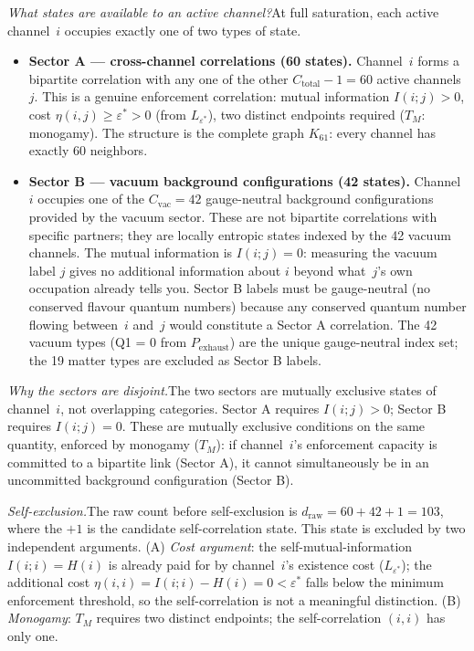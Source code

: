 \documentclass[11pt]{article}
\newenvironment{varlist}{\begin{itemize}[nosep,leftmargin=2em]}{\end{itemize}}
\begin{document}
\textit{What states are available to an active channel?}\quad  At full saturation, each active channel~$i$ occupies exactly one of two types of state.

\begin{varlist}
\item \textbf{Sector A --- cross-channel correlations (60 states).}  Channel~$i$ forms a bipartite correlation with any one of the other $C_{\mathrm{total}} - 1 = 60$ active channels~$j$.  This is a genuine enforcement correlation: mutual information $I(i;j) > 0$, cost $\eta(i,j) \ge \varepsilon^* > 0$ (from $L_{\varepsilon^*}$), two distinct endpoints required ($T_M$: monogamy).  The structure is the complete graph $K_{61}$: every channel has exactly 60 neighbors.
\item \textbf{Sector B --- vacuum background configurations (42 states).}  Channel~$i$ occupies one of the $C_{\mathrm{vac}} = 42$ gauge-neutral background configurations provided by the vacuum sector.  These are not bipartite correlations with specific partners; they are locally entropic states indexed by the 42 vacuum channels.  The mutual information is $I(i;j) = 0$: measuring the vacuum label $j$ gives no additional information about $i$ beyond what~$j$'s own occupation already tells you.  Sector B labels must be gauge-neutral (no conserved flavour quantum numbers) because any conserved quantum number flowing between~$i$ and~$j$ would constitute a Sector A correlation.  The 42 vacuum types (Q1 = 0 from $P_{\mathrm{exhaust}}$) are the unique gauge-neutral index set; the 19 matter types are excluded as Sector B labels.
\end{varlist}

\textit{Why the sectors are disjoint.}\quad The two sectors are mutually exclusive states of channel~$i$, not overlapping categories.  Sector A requires $I(i;j) > 0$; Sector B requires $I(i;j) = 0$.  These are mutually exclusive conditions on the same quantity, enforced by monogamy ($T_M$): if channel~$i$'s enforcement capacity is committed to a bipartite link (Sector A), it cannot simultaneously be in an uncommitted background configuration (Sector B).

\textit{Self-exclusion.}\quad The raw count before self-exclusion is $d_{\mathrm{raw}} = 60 + 42 + 1 = 103$, where the $+1$ is the candidate self-correlation state.  This state is excluded by two independent arguments.  (A) \emph{Cost argument}: the self-mutual-information $I(i;i) = H(i)$ is already paid for by channel~$i$'s existence cost ($L_{\varepsilon^*}$); the additional cost $\eta(i,i) = I(i;i) - H(i) = 0 < \varepsilon^*$ falls below the minimum enforcement threshold, so the self-correlation is not a meaningful distinction.  (B) \emph{Monogamy}: $T_M$ requires two distinct endpoints; the self-correlation $(i,i)$ has only one.
\end{document}
